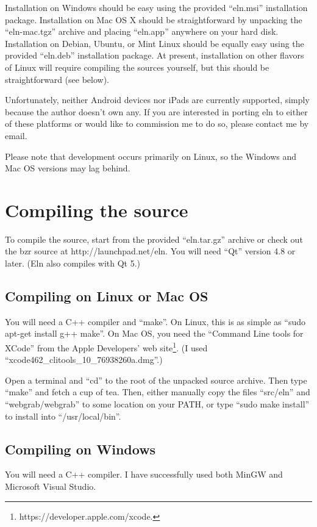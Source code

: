 \documentclass[11pt]{report}
\begin{document}
Installation on Windows should be easy using the provided ``eln.msi''
installation package. Installation on Mac OS X should be
straightforward by unpacking the ``eln-mac.tgz'' archive and placing
``eln.app'' anywhere on your hard disk.  Installation on Debian,
Ubuntu, or Mint Linux should be equally easy using the provided
``eln.deb'' installation package. At present, installation on other
flavors of Linux will require compiling the sources yourself, but this
should be straightforward (see below).

Unfortunately, neither Android devices nor iPads are currently
supported, simply because the author doesn't own any. If you are
interested in porting eln to either of these platforms or would like
to commission me to do so, please contact me by email.

Please note that development occurs
primarily on Linux, so the Windows and Mac OS versions may lag
behind.

\section{Compiling the source}
To compile the source,  start from the provided
``eln.tar.gz'' archive or check out the bzr source at http://launchpad.net/eln. You will need
``Qt'' version 4.8 or later. (Eln also compiles with Qt 5.)

\subsection{Compiling on Linux or Mac OS}

You will need a C++ compiler and ``make''. On Linux, this is as simple
as ``sudo apt-get install g++ make''. On Mac OS, you need the
``Command Line tools for XCode'' from the Apple Developers' web
site\footnote{https://developer.apple.com/xcode.}. (I used ``xcode462\_clitools\_10\_76938260a.dmg''.)

Open a terminal and ``cd'' to the root of the unpacked source
archive. Then type ``make'' and fetch a cup of tea. Then, either
manually copy the files ``src/eln'' and
``webgrab/webgrab'' to some location on your PATH, or type ``sudo make
install'' to install into ``/usr/local/bin''.

\subsection{Compiling on Windows}
You will need a C++ compiler. I have successfully used both MinGW and
Microsoft Visual Studio.
\end{document}
